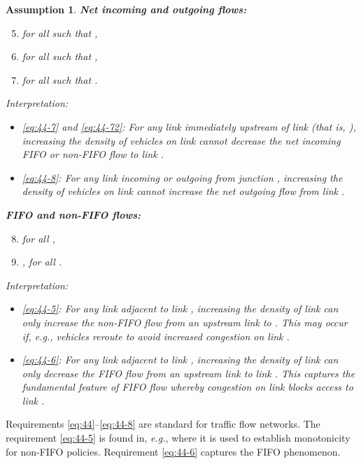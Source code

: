 \documentclass[letterpaper, 10 pt, conference]{ieeeconf}
\newtheorem{assum}{Assumption}
\begin{document}
\begin{assum}
\noindent \textbf{Net incoming and outgoing flows:}
\begin{enumerate}[label={(A\arabic*)},labelindent=*,leftmargin=*,itemsep=2pt]
\setcounter{enumi}{4}
\item \label{eq:44-7}  for all  such that ,
\item \label{eq:44-72}  for all  such that ,
\item \label{eq:44-8}   for all  such that .
  \end{enumerate}
Interpretation:
\begin{itemize}[leftmargin=*]
\item \ref{eq:44-7} and \ref{eq:44-72}: For any link  immediately upstream of link  (that is, ), increasing the density of vehicles on link  cannot decrease the net incoming FIFO or non-FIFO flow to link .
\item \ref{eq:44-8}: For any link  incoming or outgoing from junction , increasing the density of vehicles on link  cannot increase the net outgoing flow from link .
\end{itemize}
\noindent \textbf{FIFO and non-FIFO flows:}
\begin{enumerate}[label={(A\arabic*)},labelindent=*,leftmargin=*]
\setcounter{enumi}{7}
\item \label{eq:44-5}  for all ,
\item \label{eq:44-6} , for all .
  \end{enumerate}
Interpretation:
\begin{itemize}[leftmargin=*]
\item \ref{eq:44-5}: For any link  adjacent to link , increasing the density of link  can only increase the non-FIFO flow from an upstream link  to . This may occur if, \emph{e.g.}, vehicles reroute to avoid increased congestion on link .
\item \ref{eq:44-6}: For any link  adjacent to link , increasing the density of link  can only decrease the FIFO flow from an upstream link  to link . This captures the fundamental feature of FIFO flow whereby congestion on link  blocks access to link .
\end{itemize}
\end{assum}


Requirements \ref{eq:44}--\ref{eq:44-8} are standard for traffic flow networks. The requirement \ref{eq:44-5} is found in, \emph{e.g.}, \cite[Definition 2]{Como:2015ne} where it is used to establish monotonicity for non-FIFO policies. Requirement \ref{eq:44-6} captures the FIFO phenomenon.
\end{document}
